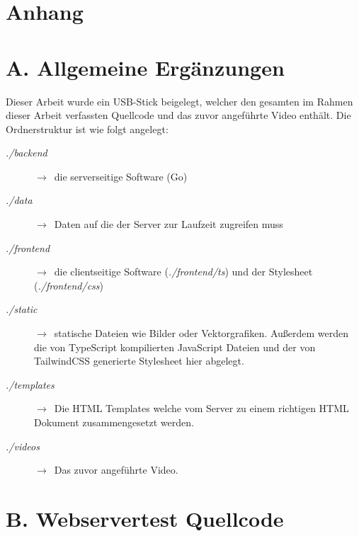 
\section*{Anhang}\label{sec:anhang}

\appendix
\section*{A. Allgemeine Ergänzungen}
Dieser Arbeit wurde ein USB-Stick beigelegt, welcher den gesamten im Rahmen 
dieser Arbeit verfassten Quellcode und das zuvor angeführte Video enthält. Die
Ordnerstruktur ist wie folgt angelegt:

\begin{description}
    \item[\textit{./backend}] $\rightarrow$~die serverseitige Software (Go)

    \item[\textit{./data}] $\rightarrow$~Daten auf die der Server zur Laufzeit 
    zugreifen muss

    \item[\textit{./frontend}] $\rightarrow$~die clientseitige Software 
    (\textit{./frontend/ts}) und der Stylesheet (\textit{./frontend/css})

    \item[\textit{./static}] $\rightarrow$~statische Dateien wie Bilder oder Vektorgrafiken.
    Außerdem werden die von TypeScript kompilierten JavaScript Dateien und der 
    von TailwindCSS generierte Stylesheet hier abgelegt.

    \item[\textit{./templates}] $\rightarrow$~Die HTML Templates welche vom Server
    zu einem richtigen HTML Dokument zusammengesetzt werden.
    
    \item[\textit{./videos}] $\rightarrow$~Das zuvor angeführte Video.

\end{description}

\section*{B. Webservertest Quellcode}






